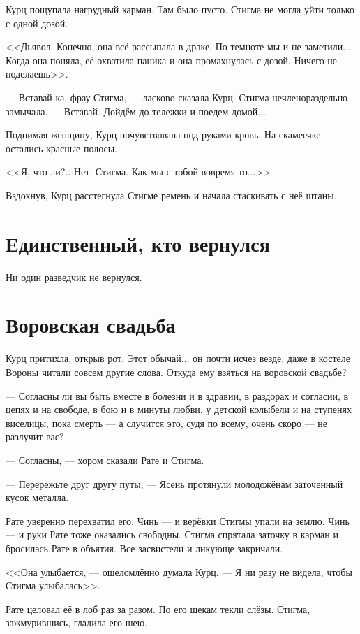 Курц пощупала нагрудный карман.
Там было пусто.
Стигма не могла уйти только с одной дозой.

<<Дьявол.
Конечно, она всё рассыпала в драке.
По темноте мы и не заметили...
Когда она поняла, её охватила паника и она промахнулась с дозой.
Ничего не поделаешь>>.

--- Вставай-ка, фрау Стигма, --- ласково сказала Курц.
Стигма нечленораздельно замычала.
--- Вставай.
Дойдём до тележки и поедем домой...

Поднимая женщину, Курц почувствовала под руками кровь.
На скамеечке остались красные полосы.

<<Я, что ли?..
Нет.
Стигма.
Как мы с тобой вовремя-то...>>

Вздохнув, Курц расстегнула Стигме ремень и начала стаскивать с неё штаны.

\section{Единственный, кто вернулся}

Ни один разведчик не вернулся.

\section{Воровская свадьба}

Курц притихла, открыв рот.
Этот обычай... он почти исчез везде, даже в костеле Вороны читали совсем другие слова.
Откуда ему взяться на воровской свадьбе?

--- Согласны ли вы быть вместе в болезни и в здравии, в раздорах и согласии, в цепях и на свободе, в бою и в минуты любви, у детской колыбели и на ступенях виселицы, пока смерть --- а случится это, судя по всему, очень скоро --- не разлучит вас?

--- Согласны, --- хором сказали Рате и Стигма.

--- Перережьте друг другу путы, --- Ясень протянули молодожёнам заточенный кусок металла.

Рате уверенно перехватил его.
Чинь --- и верёвки Стигмы упали на землю.
Чинь --- и руки Рате тоже оказались свободны.
Стигма спрятала заточку в карман и бросилась Рате в объятия.
Все засвистели и ликующе закричали.

<<Она улыбается, --- ошеломлённо думала Курц.
--- Я ни разу не видела, чтобы Стигма улыбалась>>.

Рате целовал её в лоб раз за разом.
По его щекам текли слёзы.
Стигма, зажмурившись, гладила его шею.

